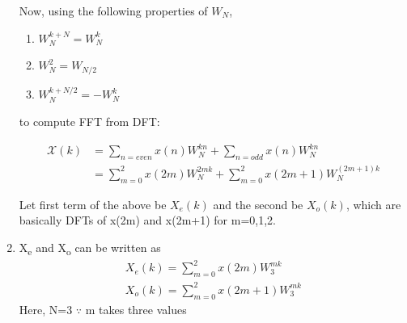 \documentclass[journal,12pt,twocolumn]{IEEEtran}
\renewcommand\thesection{\arabic{section}}
\begin{document}
\begin{enumerate}[label=\thesection.\arabic*.,ref=\thesection.\theenumi]
Now, using the following properties of $W_{N}$,  \bigskip
\begin{enumerate}
    \item $ W^{k+N}_{N} =  W^{k}_{N}  $ \bigskip
    \item $ W^{2}_{N} =  W_{N/2}  $ \bigskip
    \item $W^{k+N/2}_{N} = - W^{k}_{N}$ \bigskip
\end{enumerate}
to compute FFT from DFT:

\begin{align}
       \mathcal X(k) &=  \sum_{n=even} x(n)W^{kn}_{N} + \sum_{n=odd} x(n)W^{kn}_{N} \\
       &= \sum_{m=0}^{2} x(2m)W^{2mk}_{N} + \sum_{m=0}^{2} x(2m+1)W^{(2m+1)k}_{N} 
    \end{align}

Let first term of the above be $X_e(k)$ and the second be $X_o(k)$, which are basically DFTs of x(2m) and x(2m+1) for m=0,1,2. \bigskip

\item X\textsubscript{e} and X\textsubscript{o} can be written as
\begin{align}
    X_{e}(k) = \sum_{m=0}^{2} x(2m)W^{mk}_{3} \\
    X_{o}(k) = \sum_{m=0}^{2} x(2m+1)W^{mk}_{3}
\end{align}
Here, N=3 $\because$ m takes three values \bigskip


\end{enumerate}
\end{document}
